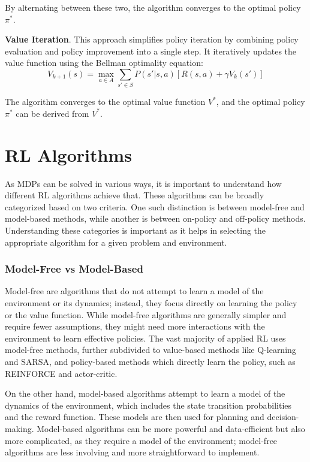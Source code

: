 By alternating between these two, the algorithm converges to the optimal policy $\pi^*$.

\textbf{Value Iteration}. This approach simplifies policy iteration by combining policy evaluation and policy improvement into a single step.
It iteratively updates the value function using the Bellman optimality equation:
\[
V_{k+1}(s) = \max_{a \in A} \sum_{s' \in S} P(s'|s,a) \left[ R(s,a) + \gamma V_k(s') \right]
\]

The algorithm converges to the optimal value function $V^*$, and the optimal policy $\pi^*$ can be derived from $V^*$.


\section{RL Algorithms}

As \gls{MDP}s can be solved in various ways, it is important to understand how different \gls{RL} algorithms achieve that.
These algorithms can be broadly categorized based on two criteria.
One such distinction is between model-free and model-based methods, while another is between on-policy and off-policy methods.
Understanding these categories is important as it helps in selecting the appropriate algorithm for a given problem and environment.

\subsubsection{Model-Free vs Model-Based}

Model-free are algorithms that do not attempt to learn a model of the environment or its dynamics; instead, they focus directly on learning the policy or the value function.
While model-free algorithms are generally simpler and require fewer assumptions, they might need more interactions with the environment to learn effective policies.
The vast majority of applied RL uses model-free methods, further subdivided to value-based methods like Q-learning and SARSA, and policy-based methods which directly learn the policy, such as REINFORCE and actor-critic.

On the other hand, model-based algorithms attempt to learn a model of the dynamics of the environment, which includes the state transition probabilities and the reward function.
These models are then used for planning and decision-making.
Model-based algorithms can be more powerful and data-efficient but also more complicated, as they require a model of the environment; model-free algorithms are less involving and more straightforward to implement.

